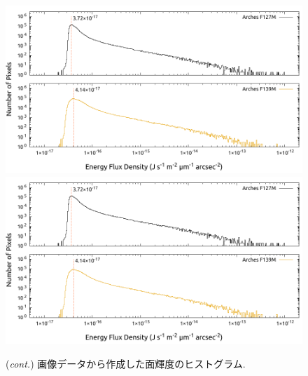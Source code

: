 \documentclass[10pt,a4paper,dvipdfmx,uplatex]{jsarticle}
\begin{document}
\addtocounter{figure}{-1}
\begin{figure}
  \centering
  \includegraphics[page=7,width=.9\linewidth]{img/histogram.pdf}
  \includegraphics[page=8,width=.9\linewidth]{img/histogram.pdf}
  \caption{(\textit{cont.}) 画像データから作成した面輝度のヒストグラム.}
  \label{fig:histogram:3}
\end{figure}
\end{document}
